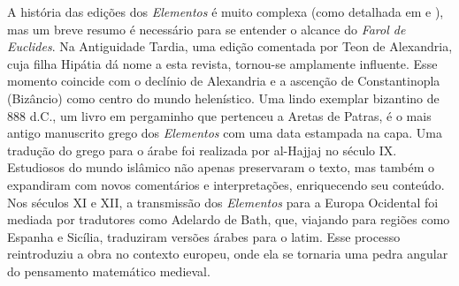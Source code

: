 \documentclass{hipatia}
\begin{document}
A história das edições dos \emph{Elementos}
é muito complexa (como detalhada em \cite{derisi2016} 
e \cite{Wardhaugh2021}), mas um breve resumo
é necessário para se entender o alcance
do \emph{Farol de Euclides}.
Na Antiguidade Tardia, uma edição comentada por Teon de
Alexandria, cuja filha Hipátia dá nome a esta revista,
tornou-se amplamente
influente. Esse momento coincide com
o declínio de Alexandria e a ascenção
de Constantinopla (Bizâncio)
como centro do mundo helenístico. Uma 
lindo exemplar bizantino de 888 d.C., 
um livro em pergaminho que pertenceu
a Aretas de Patras, é o mais antigo
manuscrito grego dos \emph{Elementos}
com uma data estampada na capa.
Uma tradução do grego para o árabe
foi realizada por al-Hajjaj no século IX.
Estudiosos do mundo islâmico não apenas
preservaram o texto, mas também o expandiram com novos
comentários e interpretações, enriquecendo seu conteúdo. Nos
séculos XI e XII, a transmissão dos \emph{Elementos} para a Europa
Ocidental foi mediada por tradutores como Adelardo de Bath,
que, viajando para regiões como Espanha e Sicília,
traduziram versões árabes para o latim. Esse processo
reintroduziu a obra no contexto europeu, onde ela se
tornaria uma pedra angular do pensamento matemático
medieval.
\end{document}
